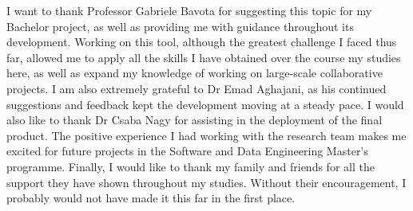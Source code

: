 \begin{acknowledgements}

\addchaptertocentry{\acknowledgementname}

I want to thank Professor Gabriele Bavota for suggesting this topic for my Bachelor project, as well as providing me with guidance throughout its development.
Working on this tool, although the greatest challenge I faced thus far, allowed me to apply all the skills I have obtained over the course my studies here, as well as expand my knowledge of working on large-scale collaborative projects.
I am also extremely grateful to Dr Emad Aghajani, as his continued suggestions and feedback kept the development moving at a steady pace.
I would also like to thank Dr Csaba Nagy for assisting in the deployment of the final product.
The positive experience I had working with the research team makes me excited for future projects in the Software and Data Engineering Master's programme.
Finally, I would like to thank my family and friends for all the support they have shown throughout my studies.
Without their encouragement, I probably would not have made it this far in the first place.

\end{acknowledgements}
